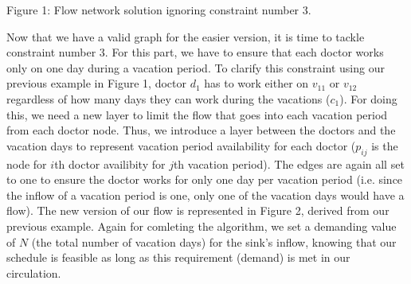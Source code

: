 \vspace*{1cm}
{\centering {} \par}
{\centering Figure 1: Flow network solution ignoring constraint number 3.\par}

Now that we have a valid graph for the easier version, it is time to tackle constraint number 3. For this part,
we have to ensure that each doctor works only on one day during a vacation period. To clarify this constraint using our previous example in Figure 1,
doctor $d_1$ has to work either on $v_{11}$ or $v_{12}$ regardless of how many days they can work during the vacations ($c_1$). For doing this, we need 
a new layer to limit the flow that goes into each vacation period from each doctor node. Thus, we introduce a layer between the doctors and the vacation days
to represent vacation period availability for each doctor ($p_{ij}$ is the node for $i$th doctor availibity for $j$th vacation period). The edges are again all set
to one to ensure the doctor works for only one day per vacation period (i.e. since the inflow of a vacation period is one, only one of the
vacation days would have a flow). The new version of our flow is represented in Figure 2, derived from our previous example. 
Again for comleting the algorithm, we set a demanding value of $N$ (the total number of vacation days) for the sink's inflow, knowing that our schedule is feasible as long as this
requirement (demand) is met in our circulation.


